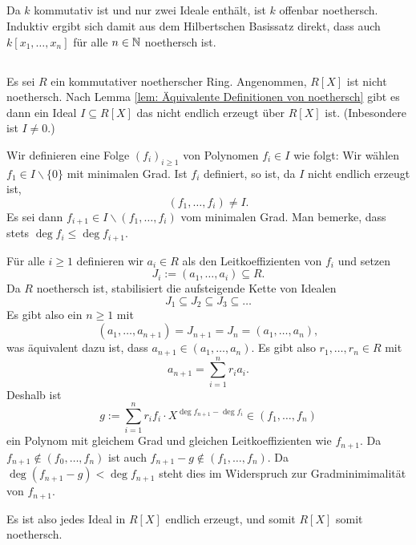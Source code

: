 \documentclass[a4paper,10pt]{article}
\begin{document}
\subsection{}
Da $k$ kommutativ ist und nur zwei Ideale enthält, ist $k$ offenbar noethersch. Induktiv ergibt sich damit aus dem Hilbertschen Basissatz direkt, dass auch $k[x_1, \ldots, x_n]$ für alle $n \in \mathbb{N}$ noethersch ist.


\subsection{}
Es sei $R$ ein kommutativer noetherscher Ring. Angenommen, $R[X]$ ist nicht noethersch. Nach Lemma \ref{lem: Äquivalente Definitionen von noethersch} gibt es dann ein Ideal $I \subseteq R[X]$ das nicht endlich erzeugt über $R[X]$ ist. (Inbesondere ist $I \neq 0$.)

Wir definieren eine Folge $(f_i)_{i \geq 1}$ von Polynomen $f_i \in I$ wie folgt: Wir wählen $f_1 \in I \smallsetminus \{0\}$ mit minimalen Grad. Ist $f_i$ definiert, so ist, da $I$ nicht endlich erzeugt ist,
\[
 (f_1, \ldots, f_i) \neq I.
\]
Es sei dann $f_{i+1} \in I \smallsetminus (f_1, \ldots, f_i)$ vom minimalen Grad. Man bemerke, dass stets $\deg f_i \leq \deg f_{i+1}$.

Für alle $i \geq 1$ definieren wir $a_i \in R$ als den Leitkoeffizienten von $f_i$ und setzen
\[
 J_i := (a_1, \ldots, a_i) \subseteq R.
\]
Da $R$ noethersch ist, stabilisiert die aufsteigende Kette von Idealen
\[
 J_1 \subseteq J_2 \subseteq J_3 \subseteq \ldots
\]
Es gibt also ein $n \geq 1$ mit
\[
 (a_1, \ldots, a_{n+1}) = J_{n+1} = J_n = (a_1, \ldots, a_n),
\]
was äquivalent dazu ist, dass $a_{n+1} \in (a_1, \ldots, a_n)$. Es gibt also $r_1, \ldots, r_n \in R$ mit
\[
 a_{n+1} = \sum_{i=1}^n r_i a_i.
\]
Deshalb ist
\[
 g := \sum_{i=1}^n r_i f_i \cdot X^{\deg f_{n+1} - \deg f_i} \in (f_1, \ldots, f_n)
\]
ein Polynom mit gleichem Grad und gleichen Leitkoeffizienten wie $f_{n+1}$. Da $f_{n+1} \not\in (f_0, \ldots, f_n)$ ist auch $f_{n+1}-g \not\in (f_1, \ldots, f_n)$. Da $\deg (f_{n+1}-g) < \deg f_{n+1}$ steht dies im Widerspruch zur Gradminimimalität von $f_{n+1}$.

Es ist also jedes Ideal in $R[X]$ endlich erzeugt, und somit $R[X]$ somit noethersch.






\section{}
\end{document}
